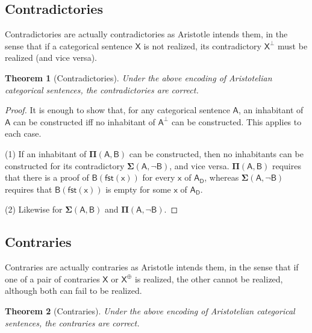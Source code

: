 \documentclass{article}
\newtheorem{theorem}{Theorem}
\newcommand\e{\mathsf}
\def\Empty/{\e{\bot}}
\def\x/{\e{x}}
\def\A/{\e{A}}
\def\X/{\e{X}}
\def\Domain/{\e{D}}
\newcommand\Contradictory[1]{\e{#1^{\Empty/}}}
\newcommand\Contrary[1]{\e{#1^{\oplus}}}
\newcommand\Dep[2]{\e{#1(#2)}}
\newcommand\First[1]{\e{fst(#1)}}
\newcommand\Gen[2]{\e{#1_{#2}}}
\newcommand\PI[2]{\mathbf{\Pi}\e{(#1, #2)}}
\newcommand\SIG[2]{\mathbf{\Sigma}\e{(#1, #2)}}
\begin{document}
\subsection{Contradictories}

Contradictories are actually contradictories as Aristotle intends them, in the sense that if a categorical sentence $\X/$ is not realized, its contradictory $\Contradictory{X}$ must be realized (and vice versa).

\begin{theorem}[Contradictories]
  \label{theorem:contradictories}
  Under the above encoding of Aristotelian categorical sentences, the contradictories are correct.
\end{theorem}

\begin{proof}
  It is enough to show that, for any categorical sentence $\A/$, an inhabitant of $\A/$ can be constructed iff no inhabitant of $\Contradictory{A}$ can be constructed. This applies to each case.

  (1) If an inhabitant of $\PI{A}{B}$ can be constructed, then no inhabitants can be constructed for its contradictory $\SIG{A}{\lnot B}$, and vice versa. $\PI{A}{B}$ requires that there is a proof of $\Dep{B}{\First{x}}$ for every $\x/$ of $\Gen{A}{\Domain/}$, whereas $\SIG{A}{\lnot B}$ requires that $\Dep{B}{\First{x}}$ is empty for some $\x/$ of $\Gen{A}{\Domain/}$.
  
  (2) Likewise for $\SIG{A}{B}$ and $\PI{A}{\lnot B}$.
\end{proof}


\subsection{Contraries}

Contraries are actually contraries as Aristotle intends them, in the sense that if one of a pair of contraries $\X/$ or $\Contrary{X}$ is realized, the other cannot be realized, although both can fail to be realized.

\begin{theorem}[Contraries]
  \label{theorem:contraries}
  Under the above encoding of Aristotelian categorical sentences, the contraries are correct.
\end{theorem}
\end{document}
